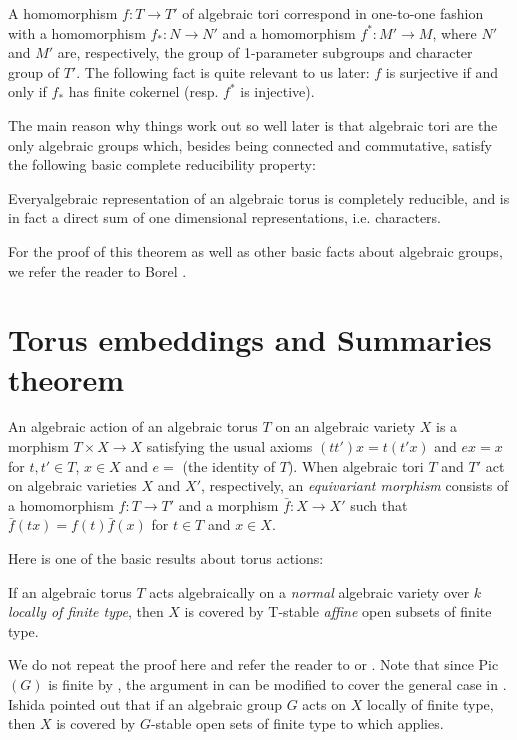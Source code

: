 A homomorphism $f : T \rightarrow T'$ of algebraic tori correspond in
one-to-one fashion with a homomorphism $f_* : N \rightarrow N'$ and a
homomorphism $f^* : M' \rightarrow M$, where $N'$ and $M'$ are,
respectively, the group of 1-parameter subgroups and character group
of $T'$. The following fact is quite relevant to us later: $f$ is
surjective if and only if $f_*$ has finite cokernel (resp. $f^*$ is
injective). 

The main reason why things work out so well later is that algebraic
tori are the only algebraic groups which, besides being connected and
commutative, satisfy the following basic complete reducibility
property: 

\begin{theorem*}
Every\pageoriginale algebraic representation of an algebraic torus is
completely reducible, and is in fact a direct sum of one dimensional 
representations, i.e. characters. 
\end{theorem*}

For the proof of this theorem as well as other basic facts about
algebraic groups, we refer the reader to Borel \cite{keyB1}. 

\section{Torus embeddings and Summaries theorem}\label{chap1:sec2}

An algebraic action of an algebraic torus $T$ on an algebraic variety
$X$ is a morphism $T \times X \rightarrow X$ satisfying the usual
axioms $(tt')x = t(t'x)$ and $ex = x $ for $t, t' \in T$, $x \in X$
and  $e=$ (the identity of $T$). When algebraic tori $T$ and $T'$ act
on algebraic varieties $X$ and $X'$, respectively, an
\textit{equivariant morphism} consists of a homomorphism $f : T
\rightarrow T'$ and a morphism $\bar{f} : X \rightarrow X'$ such that
$\bar{f}(tx) = f(t) \bar{f} (x)$ for $t \in T$ and $x \in X$. 

Here is one of the basic results about torus actions:

\begin{theorem*}[(Sumihiro)]
If an algebraic torus $T$ acts algebraically on a {\em{normal}}
algebraic variety over $k$ {\em{locally of finite type}}, then $X$ is
covered by T-stable {\em{affine}} open subsets of finite type. 
\end{theorem*}

We do not repeat the proof  here and refer the reader to \cite{keyS3} or
\cite[I.2, Thm.5]{keyTE}. Note that since Pic$(G)$ is finite by
\cite[Cor. VII 1.6]{keyR2}, the argument in \cite{keyTE} can be
modified to cover the general 
case in \cite{keyS3}. Ishida pointed out that if an algebraic group $G$ acts
on $X$ locally of finite type, then $X$ is covered by\pageoriginale
$G$-stable open sets of finite type to which \cite{keyS3} applies. 

